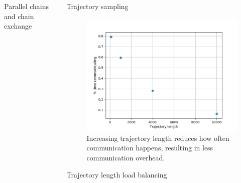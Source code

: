 \documentclass[final]{beamer}
\newlength{\onecolwid}
\newlength{\twocolwid}
\begin{document}
\begin{frame}[t]
\begin{columns}[t]
\begin{column}{\twocolwid}
\begin{columns}[t,totalwidth=\twocolwid]
\begin{column}{\onecolwid}
\begin{block}{Parallel chains and chain exchange}
\end{block}


\end{column} %

\begin{column}{\onecolwid}\vspace{-.6in} %


\begin{block}{Trajectory sampling}
  \begin{figure}
    \includegraphics[width=0.8\linewidth]{poster-figures/traj_length_slowdown.png}
    \caption{Increasing trajectory length reduces how often communication happens, resulting in less
      communication overhead.}
    \label{fig:less-comm}
  \end{figure}
\end{block}

\begin{block}{Trajectory length load balancing}


\end{block}
\end{column}
\end{columns}
\end{column}
\end{columns}
\end{frame}
\end{document}
